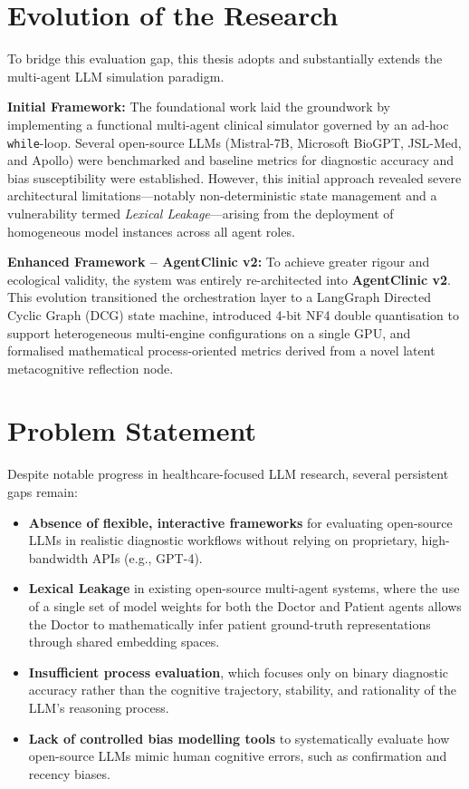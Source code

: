 \section{Evolution of the Research}

To bridge this evaluation gap, this thesis adopts and substantially extends the multi-agent LLM simulation paradigm.

\textbf{Initial Framework:} The foundational work laid the groundwork by implementing a functional multi-agent clinical simulator governed by an ad-hoc \texttt{while}-loop. Several open-source LLMs (Mistral-7B, Microsoft BioGPT, JSL-Med, and Apollo) were benchmarked and baseline metrics for diagnostic accuracy and bias susceptibility were established. However, this initial approach revealed severe architectural limitations—notably non-deterministic state management and a vulnerability termed \textit{Lexical Leakage}—arising from the deployment of homogeneous model instances across all agent roles.

\textbf{Enhanced Framework -- AgentClinic v2:} To achieve greater rigour and ecological validity, the system was entirely re-architected into \textbf{AgentClinic v2}. This evolution transitioned the orchestration layer to a LangGraph Directed Cyclic Graph (DCG) state machine, introduced 4-bit NF4 double quantisation to support heterogeneous multi-engine configurations on a single GPU, and formalised mathematical process-oriented metrics derived from a novel latent metacognitive reflection node.

\section{Problem Statement}

Despite notable progress in healthcare-focused LLM research, several persistent gaps remain:
\begin{itemize}
    \item \textbf{Absence of flexible, interactive frameworks} for evaluating open-source LLMs in realistic diagnostic workflows without relying on proprietary, high-bandwidth APIs (e.g., GPT-4).
    \item \textbf{Lexical Leakage} in existing open-source multi-agent systems, where the use of a single set of model weights for both the Doctor and Patient agents allows the Doctor to mathematically infer patient ground-truth representations through shared embedding spaces.
    \item \textbf{Insufficient process evaluation}, which focuses only on binary diagnostic accuracy rather than the cognitive trajectory, stability, and rationality of the LLM's reasoning process.
    \item \textbf{Lack of controlled bias modelling tools} to systematically evaluate how open-source LLMs mimic human cognitive errors, such as confirmation and recency biases.
\end{itemize}

